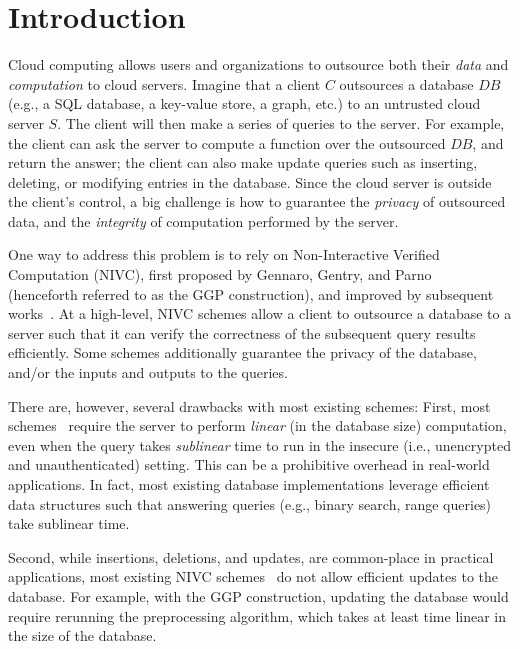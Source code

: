 \section{Introduction}
\label{sec:intro}
Cloud computing allows users and organizations to outsource
both their {\it data} and {\it computation} to cloud servers.
Imagine that a client $C$ outsources
a database $DB$ (e.g., a SQL database, a key-value store,
a graph, etc.)\@
to an untrusted cloud server $S$.
The client will then make a series of queries to the server.
For example, the client can ask the server to
compute a function over the outsourced $DB$, and return the answer;
the client can also make update queries such as inserting, deleting,
or modifying entries in the database.
Since the cloud server is outside the
client's control, a big challenge is how to guarantee the
{\it privacy} of outsourced data, and the {\it integrity}
of computation performed by the server.

One way to address this problem is to rely on Non-Interactive
Verified Computation (NIVC), first proposed by
Gennaro, Gentry, and Parno~\cite{ggp} (henceforth referred
to as the GGP construction), and
improved by subsequent works~\cite{ggp,GLR11,chung-outsource,DBLP:conf/icalp/ApplebaumIK10,memory-delegation,ParnoRV12,spanprogram,snarglinearproof}.
At a high-level, NIVC schemes allow a client to
outsource a database to a server
such that it can verify the correctness of
the subsequent query results efficiently.
Some schemes additionally guarantee the privacy
of the database, and/or the inputs and outputs to the queries.

There are, however, several drawbacks with most existing schemes:
First, most schemes~\cite{ggp,GLR11,chung-outsource,DBLP:conf/icalp/ApplebaumIK10,memory-delegation,ParnoRV12,spanprogram,snarglinearproof}
require the server to perform
{\it linear} (in the database
size) computation, even when the
query takes {\it sublinear} time to run in the insecure (i.e., unencrypted
and unauthenticated) setting.
This can be a prohibitive overhead in real-world applications.
In fact, most existing database implementations
leverage efficient data structures
such that answering queries (e.g., binary search, range queries)
take sublinear time.

Second,
while insertions, deletions, and updates,
are common-place in practical
applications,
most existing NIVC schemes~\cite{ggp,GLR11,chung-outsource,DBLP:conf/icalp/ApplebaumIK10,ParnoRV12,spanprogram,snarglinearproof}
do not allow efficient updates to the database.
For example, with the GGP construction,
updating the database would require rerunning the preprocessing
algorithm, which takes at least time linear
in the size of the database.


